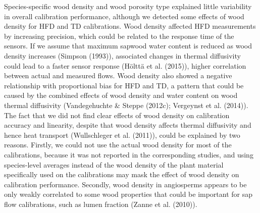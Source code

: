 \documentclass[11pt,twoside]{reedthesis}
\begin{document}
Species-specific wood density and wood porosity type explained little
variability in overall calibration performance, although we detected
some effects of wood density for HFD and TD calibrations. Wood density
affected HFD measurements by increasing precision, which could be
related to the response time of the sensors. If we assume that maximum
sapwood water content is reduced as wood density increases (Simpson
(1993)), associated changes in thermal diffusivity could lead to a
faster sensor response (Hölttä et al. (2015)), higher correlation
between actual and measured flows. Wood density also showed a negative
relationship with proportional bias for HFD and TD, a pattern that could
be caused by the combined effects of wood density and water content on
wood thermal diffusivity (Vandegehuchte \& Steppe (2012c); Vergeynst et
al. (2014)). The fact that we did not find clear effects of wood density
on calibration accuracy and linearity, despite that wood density affects
thermal diffusivity and hence heat transport (Wullschleger et al.
(2011)), could be explained by two reasons. Firstly, we could not use
the actual wood density for most of the calibrations, because it was not
reported in the corresponding studies, and using species-level averages
instead of the wood density of the plant material specifically used on
the calibrations may mask the effect of wood density on calibration
performance. Secondly, wood density in angiosperms appears to be only
weakly correlated to some wood properties that could be important for
sap flow calibrations, such as lumen fraction (Zanne et al. (2010)).\par
\end{document}
